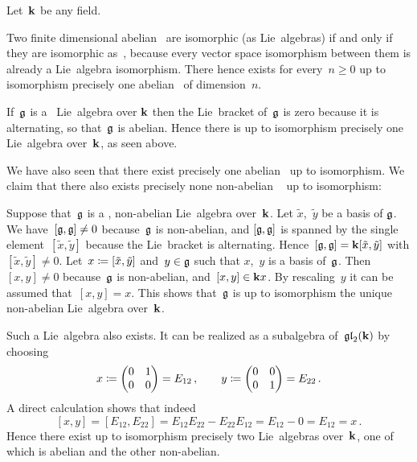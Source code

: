 \begin{example}
  Let~$\kf$ be any field.
  
  Two finite dimensional abelian~{\liealgebras{$\kf$}} are isomorphic (as Lie~algebras) if and only if they are isomorphic as~{\vectorspaces{$\kf$}}, because every vector space isomorphism between them is already a Lie~algebra isomorphism.
  There hence exists for every~$n \geq 0$ up to isomorphism precisely one abelian~{\liealgebra{$\kf$}} of dimension~$n$.
  
  If~$\mathfrak{g}$ is a~{\onedimensional} Lie~algebra over $\kf$ then the Lie~bracket of~$\mathfrak{g}$ is zero because it is alternating, so that~$\mathfrak{g}$ is abelian.
  Hence there is up to isomorphism precisely one {\onedimensional} Lie~algebra over~$\kf$, as seen above.
  
  We have also seen that there exist precisely one {\twodimensional} abelian~{\liealgebra{$\kf$}} up to isomorphism.
  We claim that there also exists precisely none non-abelian {\twodimensional}~{\liealgebra{$\kf$}} up to isomorphism:
  
  Suppose that~$\mathfrak{g}$ is a {\twodimensional}, non-abelian Lie~algebra over~$\kf$.
  Let $\tilde{x}$,~$\tilde{y}$ be a basis of $\mathfrak{g}$.
  We have~$[\mathfrak{g},\mathfrak{g}] \neq 0$ because~$\mathfrak{g}$ is non-abelian, and $[\mathfrak{g}, \mathfrak{g}]$ is spanned by the single element~$[\tilde{x}, \tilde{y}]$ because the Lie~bracket is alternating.
  Hence~$[\mathfrak{g}, \mathfrak{g}] = \mathbf{k} [\tilde{x}, \tilde{y}]$ with $[\tilde{x}, \tilde{y}] \neq 0$.
  Let~$x \coloneqq [\tilde{x},\tilde{y}]$ and~$y \in \mathfrak{g}$ such that $x$,~$y$ is a basis of~$\mathfrak{g}$.
  Then~$[x,y] \neq 0$ because~$\mathfrak{g}$ is non-abelian, and~$[x,y] \in \mathbf{k} x$.
  By rescaling~$y$ it can be assumed that~$[x,y] = x$.
 This shows that~$\mathfrak{g}$ is up to isomorphism the unique {\twodimensional} non-abelian Lie~algebra over~$\kf$.
 
  Such a Lie~algebra also exists.
  It can be realized as a subalgebra of~$\mathfrak{gl}_2(\mathbf{k})$ by choosing
  \[
    x
    \coloneqq
    \begin{pmatrix}
      0 & 1 \\
      0 & 0
    \end{pmatrix}
    =
    E_{12}  \,,
    \qquad
    y
    \coloneqq
    \begin{pmatrix}
      0 & 0 \\
      0 & 1
    \end{pmatrix}
    =
    E_{22}  \,.
  \]
  A direct calculation shows that indeed
  \[
    [x,y]
    =
    [E_{12}, E_{22}]
    =
    E_{12} E_{22} - E_{22} E_{12}
    =
    E_{12} - 0
    =
    E_{12}
    =
    x \,.
  \]
  Hence there exist up to isomorphism precisely two {\twodimensional} Lie~algebras over~$\kf$, one of which is abelian and the other non-abelian.
\end{example}



